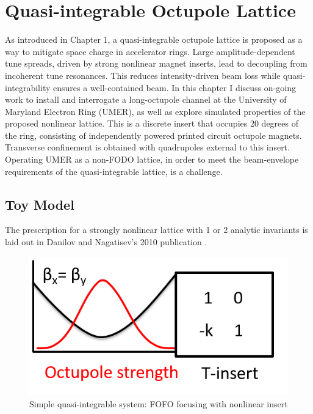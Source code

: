 


\makeatletter
\def\env@matrix{\hskip -\arraycolsep
  \let\@ifnextchar\new@ifnextchar
  \linespread{1}\selectfont
  \renewcommand{\arraystretch}{0.5}%
  \array{*\c@MaxMatrixCols c}}
\makeatother


\renewcommand{\thechapter}{5}

\chapter{Quasi-integrable Octupole Lattice}

As introduced in Chapter 1, a quasi-integrable octupole lattice is proposed as a way to mitigate space charge in accelerator rings. Large amplitude-dependent tune spreads, driven by strong nonlinear magnet inserts, lead to decoupling from incoherent tune resonances. This reduces intensity-driven beam loss while quasi-integrability ensures a well-contained beam. In this chapter I discuss on-going work to install and interrogate a long-octupole channel at the University of Maryland Electron Ring (UMER), as well as explore simulated properties of the proposed nonlinear lattice. This is a discrete insert that occupies 20 degrees of the ring, consisting of independently powered printed circuit octupole magnets. Transverse confinement is obtained with quadrupoles external to this insert. Operating UMER as a non-FODO lattice, in order to meet the beam-envelope requirements of the quasi-integrable lattice, is a challenge. 




\section{Toy Model}

The prescription for a strongly nonlinear lattice with 1 or 2 analytic invariants is laid out in Danilov and Nagatisev's 2010 publication \cite{Danilov2010}.


\begin{figure}
\centering
\includegraphics[width=.5\textwidth]{gen.figures/toy_model.png}
\caption{Simple quasi-integrable system: FOFO focusing with nonlinear insert }
\label{fig:toymodel}
\end{figure}




